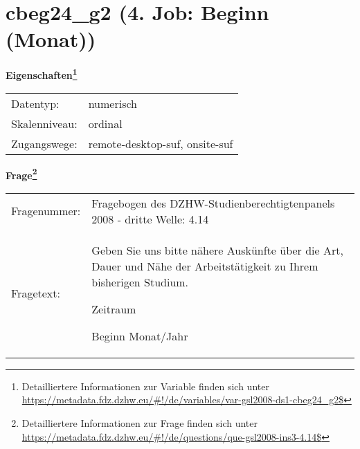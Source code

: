 
    \setcounter{footnote}{0}

    \vspace*{-1.8cm}
	\section{cbeg24\_g2 (4. Job: Beginn (Monat))}
	\label{section:cbeg24_g2}



    \vspace*{0.5cm}
    \noindent\textbf{Eigenschaften\footnote{Detailliertere Informationen zur Variable finden sich unter
		\url{https://metadata.fdz.dzhw.eu/\#!/de/variables/var-gsl2008-ds1-cbeg24_g2$}}}\\
	\begin{tabularx}{\hsize}{@{}lX}
	Datentyp: & numerisch \\
	Skalenniveau: & ordinal \\
	Zugangswege: &
	  remote-desktop-suf, 
	  onsite-suf
 \\
    \end{tabularx}



				\vspace*{0.5cm}
                \noindent\textbf{Frage\footnote{Detailliertere Informationen zur Frage finden sich unter
		              \url{https://metadata.fdz.dzhw.eu/\#!/de/questions/que-gsl2008-ins3-4.14$}}}\\
				\begin{tabularx}{\hsize}{@{}lX}
					Fragenummer: &
					  Fragebogen des DZHW-Studienberechtigtenpanels 2008 - dritte Welle:
					  4.14
 \\
					Fragetext: & Geben Sie uns bitte nähere Auskünfte über die Art, Dauer und Nähe der Arbeitstätigkeit zu Ihrem bisherigen Studium.\par  Zeitraum\par  Beginn Monat/Jahr \\
				\end{tabularx}





